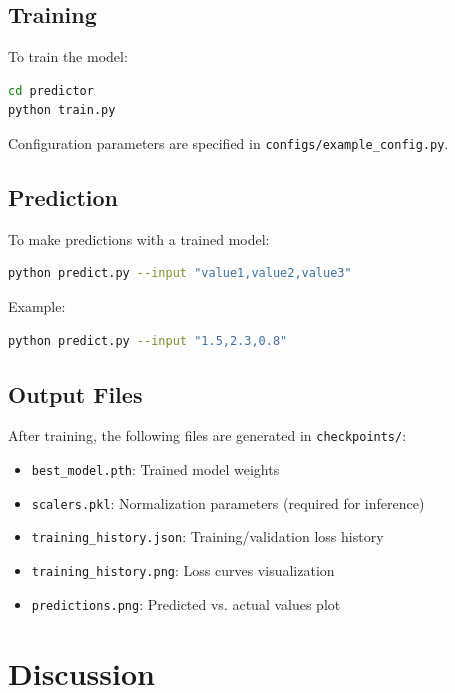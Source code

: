 \documentclass[12pt,a4paper]{article}
\begin{document}
\subsection{Training}

To train the model:

\begin{lstlisting}[language=bash]
cd predictor
python train.py
\end{lstlisting}

Configuration parameters are specified in \texttt{configs/example\_config.py}.

\subsection{Prediction}

To make predictions with a trained model:

\begin{lstlisting}[language=bash]
python predict.py --input "value1,value2,value3"
\end{lstlisting}

Example:
\begin{lstlisting}[language=bash]
python predict.py --input "1.5,2.3,0.8"
\end{lstlisting}

\subsection{Output Files}

After training, the following files are generated in \texttt{checkpoints/}:

\begin{itemize}
    \item \texttt{best\_model.pth}: Trained model weights
    \item \texttt{scalers.pkl}: Normalization parameters (required for inference)
    \item \texttt{training\_history.json}: Training/validation loss history
    \item \texttt{training\_history.png}: Loss curves visualization
    \item \texttt{predictions.png}: Predicted vs. actual values plot
\end{itemize}

\section{Discussion}
\end{document}
